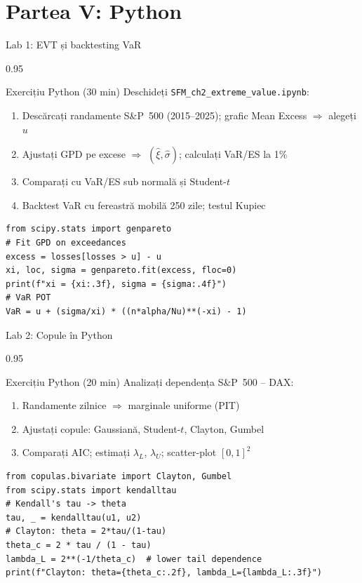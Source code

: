 \documentclass[9pt, aspectratio=169, t]{beamer}
\begin{document}
\section{Partea V: Python}

\begin{frame}[fragile]{Lab 1: EVT și backtesting VaR}
    \begin{cminipage}{0.95\textwidth}

\begin{block}{Exercițiu Python (30 min)}
\small
Deschideți \texttt{SFM\_ch2\_extreme\_value.ipynb}:
\begin{enumerate}\setlength{\itemsep}{0pt}
    \item Descărcați randamente S\&P~500 (2015--2025); grafic Mean Excess $\Rightarrow$ alegeți $u$
    \item Ajustați GPD pe excese $\Rightarrow$ $(\hat{\xi}, \hat{\sigma})$; calculați VaR/ES la 1\%
    \item Comparați cu VaR/ES sub normală și Student-$t$
    \item Backtest VaR cu fereastră mobilă 250 zile; testul Kupiec
\end{enumerate}
\end{block}

\begin{lstlisting}
from scipy.stats import genpareto
# Fit GPD on exceedances
excess = losses[losses > u] - u
xi, loc, sigma = genpareto.fit(excess, floc=0)
print(f"xi = {xi:.3f}, sigma = {sigma:.4f}")
# VaR POT
VaR = u + (sigma/xi) * ((n*alpha/Nu)**(-xi) - 1)
\end{lstlisting}
    \end{cminipage}
\end{frame}

\begin{frame}[fragile]{Lab 2: Copule în Python}
    \begin{cminipage}{0.95\textwidth}
\begin{exampleblock}{Exercițiu Python (20 min)}
\small
Analizați dependența S\&P~500 -- DAX:
\begin{enumerate}\setlength{\itemsep}{0pt}
    \item Randamente zilnice $\Rightarrow$ marginale uniforme (PIT)
    \item Ajustați copule: Gaussiană, Student-$t$, Clayton, Gumbel
    \item Comparați AIC; estimați $\lambda_L$, $\lambda_U$; scatter-plot $[0,1]^2$
\end{enumerate}
\end{exampleblock}

\begin{lstlisting}
from copulas.bivariate import Clayton, Gumbel
from scipy.stats import kendalltau
# Kendall's tau -> theta
tau, _ = kendalltau(u1, u2)
# Clayton: theta = 2*tau/(1-tau)
theta_c = 2 * tau / (1 - tau)
lambda_L = 2**(-1/theta_c)  # lower tail dependence
print(f"Clayton: theta={theta_c:.2f}, lambda_L={lambda_L:.3f}")
\end{lstlisting}
    \end{cminipage}
\end{frame}
\end{document}
